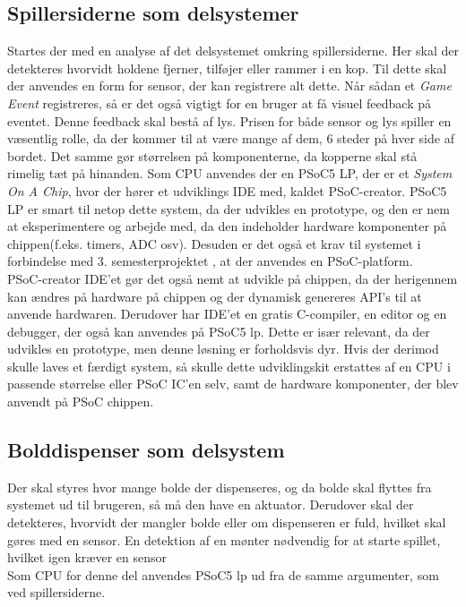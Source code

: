 \documentclass[Rapport/Rapport_main.tex]{subfiles}
\begin{document}
\subsection{Spillersiderne som delsystemer}
Startes der med en analyse af det delsystemet omkring spillersiderne. Her skal der detekteres hvorvidt holdene fjerner, tilføjer eller rammer i en kop. Til dette skal der anvendes en form for sensor, der kan registrere alt dette. Når sådan et \textit{Game Event} registreres, så er det også vigtigt for en bruger at få visuel feedback på eventet. Denne feedback skal bestå af lys. Prisen for både sensor og lys spiller en væsentlig rolle, da der kommer til at være mange af dem, 6 steder på hver side af bordet. Det samme gør størrelsen på komponenterne, da kopperne skal stå rimelig tæt på hinanden.
Som CPU anvendes der en PSoC5 LP, der er et \textit{System On A Chip}, hvor der hører et udviklings IDE med, kaldet PSoC-creator. PSoC5 LP er smart til netop dette system, da der udvikles en prototype, og den er nem at eksperimentere og arbejde med, da den indeholder hardware komponenter på chippen(f.eks. timers, ADC osv). Desuden er det også et krav til systemet i forbindelse med 3. semesterprojektet \cite{Universitet2018}, at der anvendes en PSoC-platform.\\ PSoC-creator IDE'et gør det også nemt at udvikle på chippen, da der herigennem kan ændres på hardware på chippen og der dynamisk genereres API's til at anvende hardwaren. Derudover har IDE'et en gratis C-compiler, en editor og en debugger, der også kan anvendes på PSoC5 lp. Dette er især relevant, da der udvikles en prototype, men denne løsning er forholdsvis dyr. Hvis der derimod skulle laves et færdigt system, så skulle dette udviklingskit erstattes af en CPU i passende størrelse eller PSoC IC'en selv, samt de hardware komponenter, der blev anvendt på PSoC chippen.
\subsection{Bolddispenser som delsystem}
 Der skal styres hvor mange bolde der dispenseres, og da bolde skal flyttes fra systemet ud til brugeren, så må den have en aktuator. Derudover skal der detekteres, hvorvidt der mangler bolde eller om dispenseren er fuld, hvilket skal gøres med en sensor. En detektion af en mønter nødvendig for at starte spillet, hvilket igen kræver en sensor  \\
Som CPU for denne del anvendes PSoC5 lp ud fra de samme argumenter, som ved spillersiderne.
\end{document}
